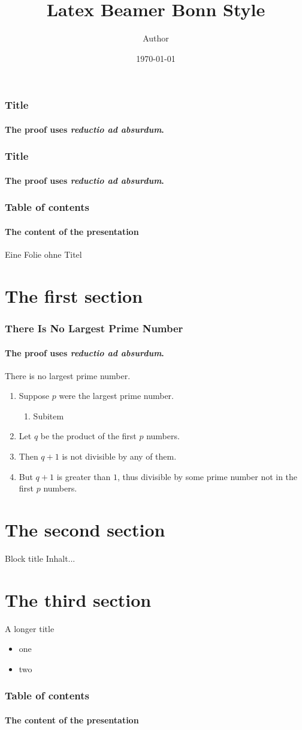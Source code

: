 \documentclass[aspectratio=1610]{beamer}
\title{Latex Beamer Bonn Style}
\date{\today}
\author{Author}
\begin{document}
	\begin{frame}[plain]
	\titlepage
\end{frame}

\begin{framecenter}
\frametitle{Title}
\framesubtitle{The proof uses \textit{reductio ad absurdum}.} 
\end{framecenter}

\begin{framevertical}
	\frametitle{Title}
	\framesubtitle{The proof uses \textit{reductio ad absurdum}.} 
\end{framevertical}


\begin{framecontent}
	\frametitle{Table of contents}
	\framesubtitle{The content of the presentation} 
\end{framecontent}



\begin{frameblank}
Eine Folie ohne Titel
\end{frameblank}

\section{The first section}
\begin{frame} 
\frametitle{There Is No Largest Prime Number} 
\framesubtitle{The proof uses \textit{reductio ad absurdum}.} 
\begin{theorem}
	There is no largest prime number. \end{theorem} 
\begin{enumerate}
	\item<1-| alert@1> Suppose $p$ were the largest prime number. 
	\begin{enumerate}
		\item Subitem
	\end{enumerate}
	\item<2-> Let $q$ be the product of the first $p$ numbers. 
	\item<3-> Then $q+1$ is not divisible by any of them. 
	\item<1-> But $q + 1$ is greater than $1$, thus divisible by some prime
	number not in the first $p$ numbers.
\end{enumerate}
\end{frame}

\section{The second section}
\begin{frame}
\begin{block}{Block title}
	Inhalt...
\end{block}
\end{frame}

\section{The third section}
\begin{frame}{A longer title}
\begin{itemize}
\item one
\item two
\end{itemize}
\end{frame}

\begin{frameverticalcontent}
	\frametitle{Table of contents}
	\framesubtitle{The content of the presentation} 
\end{frameverticalcontent}
\end{document}
